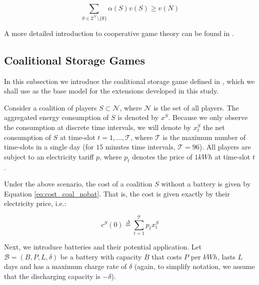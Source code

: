 \documentclass[sigconf, table]{acmart}
\newcommand{\N}{\mathcal{N}}
\newcommand{\Bat}{\mathcal{B}}
\begin{document}
\begin{equation}
\label{eq:balanced_core}
\sum_{S \in 2^{\N} \setminus \{\emptyset\}} \alpha(S)v(S) \geq v(N)
\end{equation}

A more detailed introduction to cooperative game theory can be found in \cite{rapoport1970n}.

\subsection{Coalitional Storage Games}

In this subsection we introduce the coalitional storage game defined in \cite{kiedanskigames}, which we shall use as the base model for the extensions developed in this study.

Consider a coalition of players $S \subset \N$, where $\N$ is the set of all players.
The aggregated energy consumption of $S$ is denoted by $x^S$. Because we only observe the consumption at discrete time intervals, we will denote by  $x^S_t$ the net consumption of $S$ at time-slot $t = 1, \dots, \mathcal{T}$, where $\mathcal{T}$ is the maximum number of time-slots in a single day (for $15$ minutes time intervals, $\mathcal{T}=96$).
All players are subject to an electricity tariff $p$, where $p_t$ denotes the price of $1 kWh$ at time-slot $t$.

Under the above scenario, the cost of a coalition $S$ without a battery is given by Equation \eqref{eq:cost_coal_nobat}. That is, the cost is given exactly by their electricity price, i.e.:

\begin{equation}
  \label{eq:cost_coal_nobat}
  c^S(0) \overset{\Delta}{=} \sum_{t=1}^{\mathcal{T}} p_t x^S_t
\end{equation}

Next, we introduce batteries and their potential application. Let $\Bat = (B, P, L, \delta)$ be a battery with capacity $B$ that costs $P$ per $kWh$, lasts $L$ days and has a maximum charge rate of $\delta$ (again, to simplify notation, we assume that the discharging capacity is $-\delta$).
\end{document}

